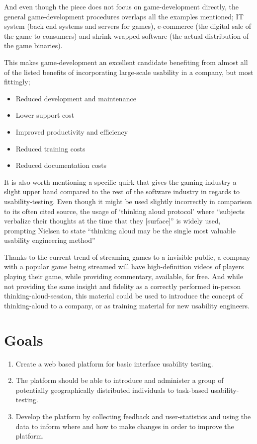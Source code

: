   And even though the piece does not focus on game-development directly, the
  general game-development procedures overlaps all the examples
  mentioned; IT system (back end systems and servers for games), e-commerce (the
  digital sale of the game to consumers) and shrink-wrapped software (the actual
  distribution of the game binaries).

  This makes game-development an excellent candidate benefiting from almost all
  of the listed benefits of incorporating large-scale usability in a company,
  but most fittingly;
  \begin{itemize}
    \item{Reduced development and maintenance}
    \item{Lower support cost}
    \item{Improved productivity and efficiency}
    \item{Reduced training costs}
    \item{Reduced documentation costs}
  \end{itemize}

  It is also worth mentioning a specific quirk that gives the gaming-industry a
  slight upper hand compared to the rest of the software industry in regards to
  usability-testing. Even though it might be used slightly
  incorrectly\cite{citeThinkAloud} in comparison to its often cited
  source\cite{ProtocolanalysisVerbalReportsAsData}, the usage of `thinking
  aloud protocol' where ``subjects verbalize their thoughts at the time that
  they [surface]''\cite[p. 60]{ProtocolanalysisVerbalReportsAsData} is widely
  used, prompting Nielsen to state ``thinking aloud may be the single most
  valuable usability engineering method''\cite[p. 195]{citeHeuristicsNielsenUsabilityEngineering}

  Thanks to the current trend of streaming games to a invisible public, a
  company with a popular game being streamed will have high-definition videos
  of players playing their game, while providing commentary, available, for
  free. And while not providing the same insight and fidelity as a correctly
  performed in-person thinking-aloud-session, this material could be used to
  introduce the concept of thinking-aloud to a company, or as training
  material for new usability
  engineers\cite{citeYouTubeGamersandThinkAloudProtocolsIntroducingUsabilityTesting}.

\section{Goals}

  \begin{enumerate}
    \item{
      Create a web based platform for basic interface usability testing.
    }
    \item {
      The platform should be able to introduce and administer a group of
      potentially geographically distributed individuals to task-based
      usability-testing.
    }
    \item{
      Develop the platform by collecting feedback and user-statistics and using
      the data to inform where and how to make changes in order to improve the
      platform.
    }
  \end{enumerate}
